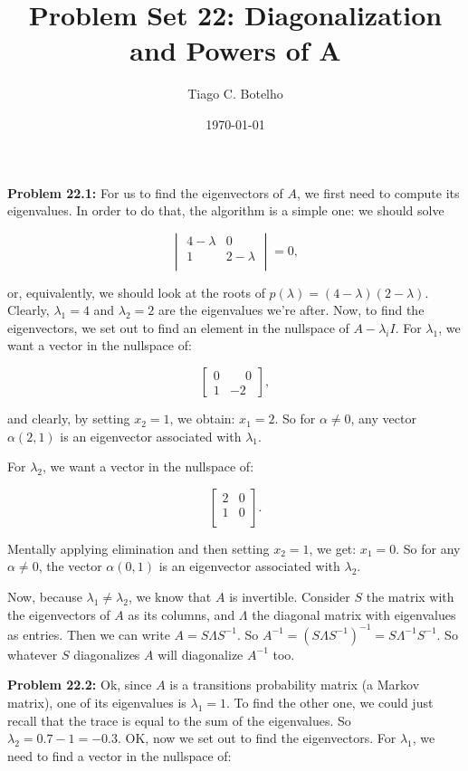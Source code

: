 \documentclass{article}
\title{Problem Set 22: Diagonalization and Powers of A}
\author{Tiago C. Botelho}
\date{\today}
\begin{document}
\maketitle

\noindent \textbf{Problem 22.1:} For us to find the eigenvectors of $A$, we first need to compute its eigenvalues. In order to do that, the algorithm is a simple one: we should solve

\[
\begin{vmatrix}
4 - \lambda & 0\\
1 & 2 - \lambda\\
\end{vmatrix}
=
0,
\]

or, equivalently, we should look at the roots of $p(\lambda) = (4-\lambda)(2-\lambda)$. Clearly, $\lambda_1 = 4$ and $\lambda_2 = 2$ are the eigenvalues we're after. Now, to find the eigenvectors, we set out to find an element in the nullspace of $A - \lambda_i I$. For $\lambda_1$, we want a vector in the nullspace of:

\[
\begin{bmatrix}
0 & \phantom{-}0\\
1 & -2
\end{bmatrix},
\]

and clearly, by setting $x_2 = 1$, we obtain: $x_1 = 2$. So for $\alpha \neq 0$, any vector $\alpha(2, 1)$ is an eigenvector associated with $\lambda_1$.

For $\lambda_2$, we want a vector in the nullspace of:

\[
\begin{bmatrix}
2 & 0\\
1 & 0\\
\end{bmatrix}.
\]

Mentally applying elimination and then setting $x_2 = 1$, we get: $x_1 = 0$. So for any $\alpha \neq 0$, the vector $\alpha(0, 1)$ is an eigenvector associated with $\lambda_2$.

Now, because $\lambda_1 \neq \lambda_2$, we know that $A$ is invertible. Consider $S$ the matrix with the eigenvectors of $A$ as its columns, and $\Lambda$ the diagonal matrix with eigenvalues as entries. Then we can write $A = S \Lambda S^{-1}$. So $A^{-1} = (S\Lambda S^{-1})^{-1} = S\Lambda^{-1} S^{-1}$. So whatever $S$ diagonalizes $A$ will diagonalize $A^{-1}$ too.

\noindent \textbf{Problem 22.2:} Ok, since $A$ is a transitions probability matrix (a Markov matrix), one of its eigenvalues is $\lambda_1 = 1$. To find the other one, we could just recall that the trace is equal to the sum of the eigenvalues. So $\lambda_2 = 0.7 - 1 = -0.3$. OK, now we set out to find the eigenvectors. For $\lambda_1$, we need to find a vector in the nullspace of:
\end{document}
